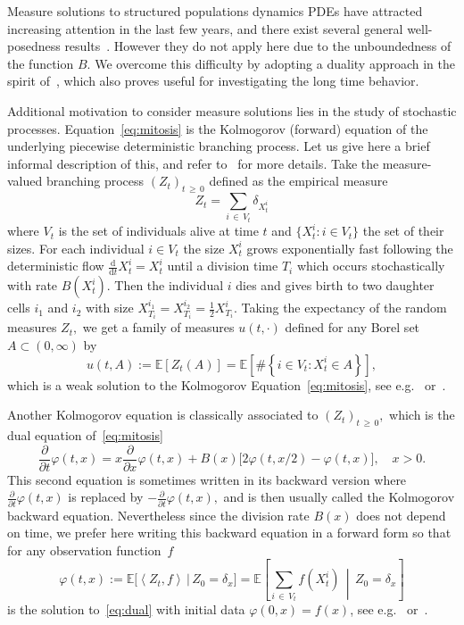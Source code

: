 \documentclass[10pt]{amsart}
\theoremstyle{definition}\newtheorem{defi}[theo]{Definition}\newtheorem{rema}[theo]{Remark}\newtheorem{exam}[theo]{Example}\newtheorem{exem}[theo]{Example}\newtheorem{nota}[theo]{Notation}
\newcommand{\p}{\partial}
\renewcommand{\geq}{\geqslant}
\newcommand{\ddt}{\frac{\p}{\p t}}
\newcommand{\ddx}{\frac{\p}{\p x}}
\newcommand{\E}{\mathbb{E}}
\newcommand{\1}{\mathds{1}}
\renewcommand{\d}{\mathrm{d}}
\begin{document}
Measure solutions to structured populations dynamics PDEs have attracted increasing attention in the last few years, and there exist several general well-posedness results~\cite{Carrillo2012,CanizoCarrilloCuadrado,EversHilleMuntean15,EversHilleMuntean16,Gwiazda2010}. However they do not apply here due to the unboundedness of the function $B$. We overcome this difficulty by adopting a duality approach in the spirit of~\cite{Bansaye2019,Bansaye2017,Dumont2017,Gabriel2018}, which also proves useful for investigating the long time behavior.



Additional motivation to consider measure solutions lies in the study of stochastic processes. Equation~\eqref{eq:mitosis} is the Kolmogorov (forward) equation of the underlying piecewise deterministic branching process. Let us give here a brief informal description of this, and refer to~\cite{Campillo,Cloez,DerfelVanBruntWake,DHKR,Marguet1} for more details. Take the measure-valued branching process $(Z_t)_{t\,\geq\,0}$ defined as the empirical measure
\[
Z_t=\sum_{i\,\in\,V_t}\delta_{X^i_t}
\]
where $V_t$ is the set of individuals alive at time $t$ and $\{X^i_t : i\in V_t\}$ the set of their sizes. For each individual $i\in V_t$ the size $X^i_t$ grows exponentially fast following the deterministic flow $\tfrac{\d}{\d t}X^i_t=X^i_t$ until a division time $T_i$ which occurs stochastically with rate $B(X^i_t).$ Then the individual $i$ dies and gives birth to two daughter cells $i_1$ and $i_2$ with size $X^{i_1}_{T_i}=X^{i_2}_{T_i}=\tfrac12 X^i_{T_i}.$ Taking the expectancy of the random measures $Z_t,$ we get a family of measures $u(t,\cdot)$ defined for any Borel set $A\subset(0,\infty)$ by
\[
u(t,A):=\E\left[Z_t(A)\right]=\E\left[\#\left\{i\in V_t:X^i_t\in A\right\}\right],
\]
which is a weak solution to the Kolmogorov Equation~\eqref{eq:mitosis}, see e.g.~\cite[Theorem~1]{DHKR} or~\cite[Corollary~5.1]{Marguet1}.

Another Kolmogorov equation is classically associated to $(Z_t)_{t\,\geq\,0},$ which is the dual equation of~\eqref{eq:mitosis}
\begin{equation}\label{eq:dual}
\ddt \varphi(t,x) = x \ddx \varphi(t,x) + B(x)\big[2\varphi(t,x/2)-\varphi(t,x)\big],\quad x>0.
\end{equation}
This second equation is sometimes written in its backward version where $\ddt \varphi(t,x)$ is replaced by $-\ddt \varphi(t,x),$ and is then usually called the Kolmogorov backward equation. Nevertheless since the division rate $B(x)$ does not depend on time, we prefer here writing this backward equation in a forward form so that for any observation function~$f$
\[
\varphi(t,x):=\E\big[\left\langle Z_t,f\right\rangle\,\big|\,Z_0=\delta_x\big]=\E\left[\sum_{i\,\in\,V_t}f\left(X^i_t\right)\,\middle|\,Z_0=\delta_x\right]
\]
is the solution to~\eqref{eq:dual} with initial data $\varphi(0,x)=f(x)$, see e.g.~\cite[Proposition~4]{Campillo} or~\cite[Corollary~2.4]{Cloez}.
\end{document}
